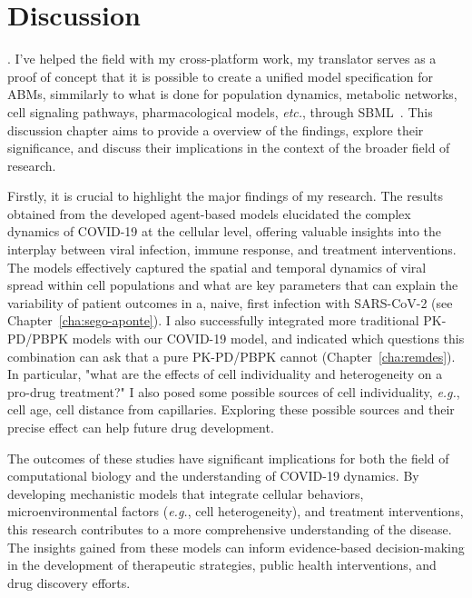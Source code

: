 \chapter{Discussion}\label{cha:disc}

. I've helped the field with my cross-platform work, my translator serves as a proof of concept that it is possible to create a unified model specification for ABMs, simmilarly to what is done for population dynamics, metabolic networks, cell signaling pathways, pharmacological models, \textit{etc.}, through SBML~\cite{hucka_systems_2003}. This discussion chapter aims to provide a overview of the findings, explore their significance, and discuss their implications in the context of the broader field of research.

Firstly, it is crucial to highlight the major findings of my research. The results obtained from the developed agent-based models elucidated the complex dynamics of COVID-19 at the cellular level, offering valuable insights into the interplay between viral infection, immune response, and treatment interventions. The models effectively captured the spatial and temporal dynamics of viral spread within cell populations and what are key parameters that can explain the variability of patient outcomes in a, naive, first infection with SARS-CoV-2 (see Chapter~\ref{cha:sego-aponte}). I also successfully integrated more traditional PK-PD/PBPK models with our COVID-19 model, and indicated which questions this combination can ask that a pure  PK-PD/PBPK cannot (Chapter~\ref{cha:remdes}). In particular, "what are the effects of cell individuality and heterogeneity on a pro-drug treatment?" I also posed some possible sources of cell individuality, \textit{e.g.}, cell age, cell distance from capillaries. Exploring these possible sources and their precise effect can help future drug development.

The outcomes of these studies have significant implications for both the field of computational biology and the understanding of COVID-19 dynamics. By developing mechanistic models that integrate cellular behaviors, microenvironmental factors (\textit{e.g.}, cell heterogeneity), and treatment interventions, this research contributes to a more comprehensive understanding of the disease. The insights gained from these models can inform evidence-based decision-making in the development of therapeutic strategies, public health interventions, and drug discovery efforts.


